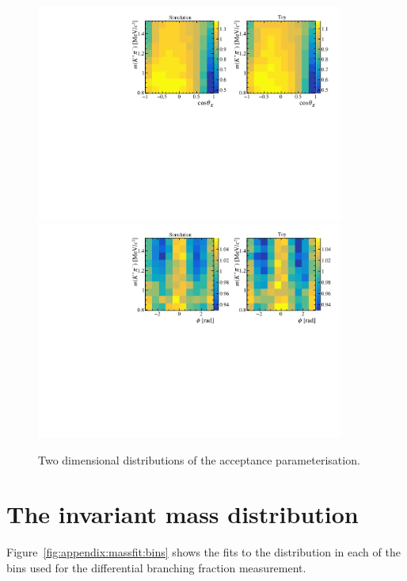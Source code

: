 \begin{figure}[!tb]
 \centering
 \includegraphics[width=0.9\textwidth]{figs/kpimm/acceptance/2d/ctk_mkpi.pdf}
 \includegraphics[width=0.9\textwidth]{figs/kpimm/acceptance/2d/phi_mkpi.pdf}
 \caption{Two dimensional distributions of the acceptance parameterisation.}
 \label{fig:acceptance:2d_4}
\end{figure}

\clearpage
\section{The \boldmath{\mkpimm} invariant mass distribution}
\label{sec:appendix:massfit}

Figure~\ref{fig:appendix:massfit:bins} shows the fits to the \mkpimm distribution in each of the \qsq bins used for the differential branching fraction measurement.
 
